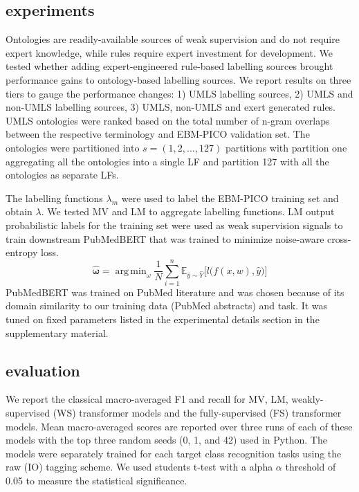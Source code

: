 \documentclass[10.7pt,]{article}
\DeclareMathOperator*{\argmin}{arg\,min}
\begin{document}
\subsection{experiments}\label{subsec:experiments}
%
Ontologies are readily-available sources of weak supervision and do not require expert knowledge, while rules require expert investment for development.
We tested whether adding expert-engineered rule-based labelling sources brought performance gains to ontology-based labelling sources.
We report results on three tiers to gauge the performance changes: 1) UMLS labelling sources, 2) UMLS and non-UMLS labelling sources, 3) UMLS, non-UMLS and exert generated rules. 
UMLS ontologies were ranked based on the total number of n-gram overlaps between the respective terminology and EBM-PICO validation set.
The ontologies were partitioned into $s = ( 1, 2, \dotso , 127 )$ partitions with partition one aggregating all the ontologies into a single LF and partition 127 with all the ontologies as separate LFs.



The labelling functions $\lambda_{m}$ were used to label the EBM-PICO training set and obtain $\lambda$. 
We tested MV and LM to aggregate labelling functions.
LM output probabilistic labels for the training set were used as weak supervision signals to train downstream PubMedBERT that was trained to minimize noise-aware cross-entropy loss.
%
\begin{equation}
\bm{\hat{\omega}} = \argmin_{\omega} \frac{1}{N} \sum_{i=1}^{n} \mathbb{ E }_{ \hat{y} \sim \hat{Y}} \big[ l \big( f(x, w), \hat{y} \big) \big]
\end{equation}
%
PubMedBERT was trained on PubMed literature and was chosen because of its domain similarity to our training data (PubMed abstracts) and task.
It was tuned on fixed parameters listed in the experimental details section in the supplementary material. 
%
%
%
\subsection{evaluation}\label{eval}
%
We report the classical macro-averaged F1 and recall for MV, LM, weakly-supervised (WS) transformer models and the fully-supervised (FS) transformer models.
Mean macro-averaged scores are reported over three runs of each of these models with the top three random seeds (0, 1, and 42) used in Python.
The models were separately trained for each target class recognition tasks using the raw (IO) tagging scheme.
We used students t-test with a alpha $\alpha$ threshold of 0.05 to measure the statistical significance.
%
\end{document}
